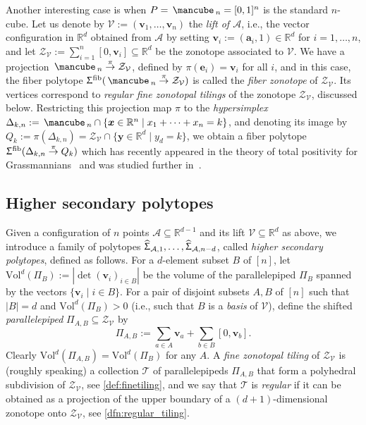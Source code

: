 \documentclass[11pt]{amsart}
\theoremstyle{plain}
\theoremstyle{definition}
\def\R{\mathbb{R}}
\def\v{{\bm{v}}}
\def\x{{\bm{x}}}
\def\y{{\bm{y}}}
\def\A{\mathcal{A}}
\def\V{\mathcal{V}}
\def\e{{\bm{e}}}
\def\a{{\bm{a}}}
\def\Zon{\mathcal{Z}}
\def\ZV{\Zon_\V}
\def\cube{\mbox{\,\mancube\,}}
\def\Vol{\mathrm{Vol}}
\def\HSP{\widehat\Upsigma}
\def\Sigma{\HSP}
\def\fiber{{\operatorname{fib}}}
\def\FibPoly{\Upsigma^\fiber}
\def\pito{\overset \pi \to}
\def\VC{\V}
\def\Tcal{\mathcal{T}}
\def\Tiling{\Tcal}
\def\tile{\Pi}
\def\VolX(#1){\Vol^d(\tile_{#1})}
\def\VolB{\VolX(B)}
\let\subset\subseteq
\begin{document}
Another interesting case is when $P=\cube_n=[0,1]^n$ is
the standard $n$-cube. Let us denote by 
$\VC:=(\v_1,\dots,\v_n)$ the \emph{lift of $\A$}, i.e., the vector configuration in $\R^d$ obtained from $\A$ by setting $\v_i:=(\a_i,1)\in\R^d$ for $i=1,\dots, n$, and let 
$\Zon_\VC:=\sum_{i=1}^n[0,\v_i]\subset \R^d$ be the zonotope associated to $\VC$. 
We have a projection 
$\cube_n\pito \Zon_\VC$, defined by $\pi(\e_i) = \v_i$ for all $i$, 
and in this case, the fiber polytope $\FibPoly(\cube_n\pito \Zon_\VC)$ is called
the \emph{fiber zonotope} of $\ZV$.  Its vertices correspond to \emph{regular fine zonotopal tilings} of the zonotope $\Zon_\VC$, discussed below.
Restricting this projection map $\pi$ to the \emph{hypersimplex} $\Delta_{k,n}:=\cube_n\cap \{\x\in\R^n\mid x_1+\dots+x_n=k\}$, and denoting its image  by $Q_k:=\pi(\Delta_{k,n})=\Zon_\VC\cap \{\y\in\R^d\mid y_d=k\}$, we obtain a fiber polytope $\FibPoly(\Delta_{k,n}\pito Q_k)$ which has recently appeared in the theory of total positivity for Grassmannians~\cite{Gal,PosICM} and was studied further in~\cite{OS}.


\subsection{Higher secondary polytopes}
Given a configuration of $n$ points $\A \subset \R^{d-1}$ and its lift 
$\V \subset \R^d$ as above, we introduce a family of polytopes $\Sigma_{\A,1},\dots,
\Sigma_{\A,n-d}$, called \emph{higher secondary polytopes}, defined as follows.
For a $d$-element subset $B$ of  $[n]$, let
$\VolB:=|\det(\v_i)_{i\in B}|$ be the volume of the parallelepiped $\tile_B$
spanned by the vectors $\{\v_i\mid i\in B\}$. For a pair of disjoint subsets
$A,B$ of $[n]$ such that $|B|=d$  and $\VolB>0$ (i.e., such that $B$ is a
\emph{basis} of $\VC$), define the shifted \emph{parallelepiped}
$\tile_{A,B}\subset\Zon_\VC$ by 
\[
\tile_{A,B}:=\sum_{a\in A} \v_a+\sum_{b\in B}
[0,\v_b].
\]  
Clearly $\Vol^d(\tile_{A,B}) = \VolB$ for any $A$.  A \emph{fine zonotopal
tiling} of $\Zon_\VC$ is (roughly speaking) a collection $\Tiling$ of
parallelepipeds $\tile_{A,B}$ that form a polyhedral subdivision of $\Zon_\VC$,
see \cref{def:finetiling},
and we say that $\Tiling$ is \emph{regular} if it can be obtained as a projection of
the upper boundary of a $(d+1)$-dimensional zonotope onto $\Zon_\VC$, see 
\cref{dfn:regular_tiling}.
\end{document}
